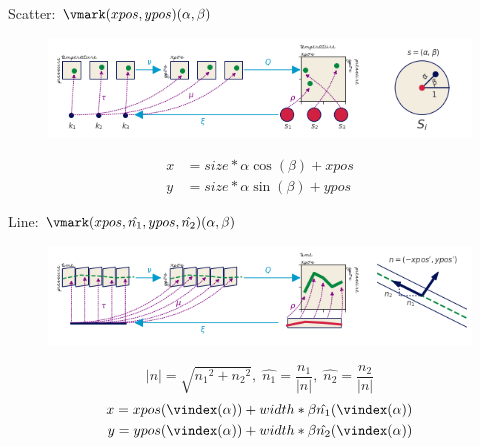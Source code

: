 \documentclass[xcolor={dvipsnames}, handout]{beamer}
\begin{document}
\begin{frame}{Scatter: $\vmark(xpos, ypos)(\alpha, \beta)$}
    \begin{figure}[H]
        \includegraphics[width=1\textwidth]{figures/math/scatter.png}
    \end{figure}
    
    \begin{align*}
        x &= size *\alpha \cos(\beta) + xpos \\
        y &= size *\alpha \sin(\beta) + ypos
    \end{align*}    
\end{frame}

\begin{frame}{Line: $\vmark(xpos, \hat{n_{1}}, ypos, \hat{n_{2}})(\alpha, \beta)$ }
    \begin{figure}[H]
        \includegraphics[width=1\textwidth]{figures/math/line.png}
    \end{figure}
        \begin{equation*}
            \lvert n \rvert = \sqrt{{n_{1}}^2 + {n_{2}}^2},\; 
            \hat{n_{1}} = \frac{n_1}{\lvert n \rvert}, \; \hat{n_{2}} = \frac{n_2}{\lvert n \rvert}
        \end{equation*}
    \begin{align*}
     x = xpos(\vindex(\alpha)) &+ width*\beta\hat{n_1}(\vindex(\alpha)) \\
     y = ypos(\vindex(\alpha)) &+ width*\beta\hat{n_2}(\vindex(\alpha)) 
    \end{align*}
\end{frame}
\end{document}
